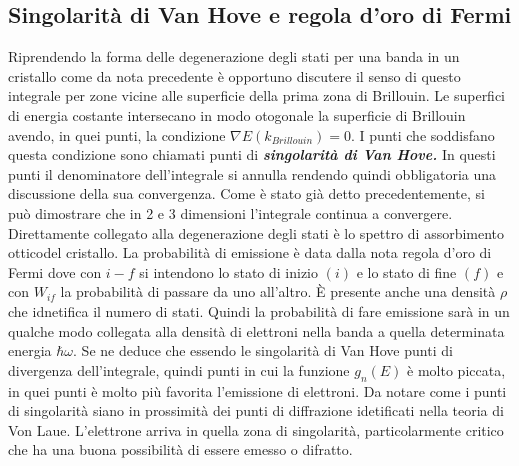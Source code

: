 \documentclass[a4paper,12pt]{article}
\begin{document}
\subsection{Singolarità di Van Hove e regola d'oro di Fermi}
Riprendendo la forma delle degenerazione degli stati per una banda in un cristallo 
come da nota precedente è opportuno discutere il senso di questo integrale per zone vicine alle superficie della prima zona di Brillouin. Le superfici di energia costante intersecano in modo otogonale la superficie di Brillouin avendo, in quei punti, la condizione $\nabla E(k_{Brillouin}) =0$. I punti che soddisfano questa condizione sono chiamati punti di \textit{\textbf{singolarità di Van Hove.}} In questi punti il denominatore dell'integrale si annulla rendendo quindi obbligatoria una discussione della sua convergenza. Come è stato già detto precedentemente, si può dimostrare che in 2 e 3 dimensioni l'integrale continua a convergere. Direttamente collegato alla degenerazione degli stati è lo spettro di assorbimento otticodel cristallo. La probabilità di emissione è data dalla nota regola d'oro di Fermi
dove con $i-f$ si intendono lo stato di inizio $(i)$ e lo stato di fine $(f)$ e con $W_{if}$ la probabilità di passare da uno all'altro. \`E presente anche una densità $\rho$ che idnetifica il numero di stati. Quindi la probabilità di fare emissione sarà in un qualche modo collegata alla densità di elettroni nella banda a quella determinata energia $\hbar\omega$. Se ne deduce che essendo le singolarità di Van Hove punti di divergenza dell'integrale, quindi punti in cui la funzione $g_n(E)$ è molto piccata, in quei punti è molto più favorita l'emissione di elettroni. Da notare come i punti di singolarità siano in prossimità dei punti di diffrazione idetificati nella teoria di Von Laue. L'elettrone arriva in quella zona di singolarità, particolarmente critico che ha una buona possibilità di essere emesso o difratto.

\begin{center}
\end{center}
\end{document}
